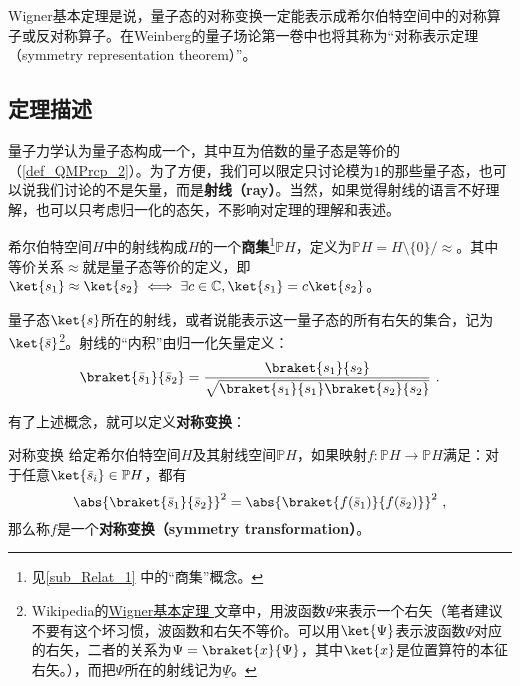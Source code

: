 





Wigner基本定理是说，量子态的对称变换一定能表示成希尔伯特空间中的对称算子或反对称算子。在Weinberg的量子场论第一卷\cite{WeinbergQFT1}中也将其称为“对称表示定理（symmetry representation theorem）”。

\subsection{定理描述}

量子力学认为量子态构成一个，其中互为倍数的量子态是等价的（\autoref{def_QMPrcp_2}）。为了方便，我们可以限定只讨论模为$1$的那些量子态，也可以说我们讨论的不是矢量，而是\textbf{射线（ray）}。当然，如果觉得射线的语言不好理解，也可以只考虑归一化的态矢，不影响对定理的理解和表述。

希尔伯特空间$H$中的射线构成$H$的一个\textbf{商集}\footnote{见\autoref{sub_Relat_1} 中的“商集”概念。}$\mathbb{P}H$，定义为${\displaystyle \mathbb {P} H=H\setminus \{0\}/{\approx }}$。其中等价关系$\approx$就是量子态等价的定义，即$\ket{s_1}\approx\ket{s_2}\iff \exists c\in\mathbb{C}, \ket{s_1}=c\ket{s_2}$。

量子态$\ket{s}$所在的射线，或者说能表示这一量子态的所有右矢的集合，记为$\ket{\bar{s}}$\footnote{Wikipedia的\href{https://en.wikipedia.org/wiki/Wigner_theorem}{Wigner基本定理
}文章中，用波函数$\Psi$来表示一个右矢（笔者建议不要有这个坏习惯，波函数和右矢不等价。可以用$\ket{\Psi}$表示波函数$\Psi$对应的右矢，二者的关系为$\Psi=\braket{x}{\Psi}$，其中$\ket{x}$是位置算符的本征右矢。），而把$\Psi$所在的射线记为$\underline{\Psi}$。}。射线的“内积”由归一化矢量定义：
\begin{equation}
\braket{\bar{s}_1}{\bar{s}_2} = \frac{\braket{s_1}{s_2}}{\sqrt{\braket{s_1}{s_1}\braket{s_2}{s_2}}}~.
\end{equation}

有了上述概念，就可以定义\textbf{对称变换}：

\begin{definition}{对称变换}\label{def_WigThe_1}
给定希尔伯特空间$H$及其射线空间$\mathbb{P}H$，如果映射$f:\mathbb{P}H\to\mathbb{P}H$满足：对于任意$\ket{\bar{s}_i}\in\mathbb{P}H$，都有
\begin{equation}\label{eq_WigThe_1}
\abs{\braket{\bar{s}_1}{\bar{s}_2}}^2 = \abs{\braket{f(\bar{s}_1)}{f(\bar{s}_2)}}^2~,
\end{equation}
那么称$f$是一个\textbf{对称变换（symmetry transformation）}。
\end{definition}

